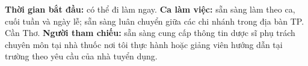 \begin{cvparagraph}

\textbf{Thời gian bắt đầu:} có thể đi làm ngay. \textbf{Ca làm việc:} sẵn sàng làm theo ca,
cuối tuần và ngày lễ; sẵn sàng luân chuyển giữa các chi nhánh trong địa bàn TP. Cần Thơ.
\textbf{Người tham chiếu:} sẵn sàng cung cấp thông tin dược sĩ phụ trách chuyên môn tại
nhà thuốc nơi tôi thực hành hoặc giảng viên hướng dẫn tại trường theo yêu cầu của nhà
tuyển dụng.

\end{cvparagraph}

